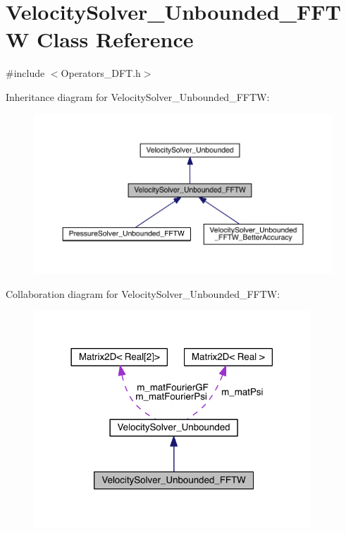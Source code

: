 \hypertarget{class_velocity_solver___unbounded___f_f_t_w}{}\section{Velocity\+Solver\+\_\+\+Unbounded\+\_\+\+F\+F\+T\+W Class Reference}
\label{class_velocity_solver___unbounded___f_f_t_w}


{\ttfamily \#include $<$Operators\+\_\+\+D\+F\+T.\+h$>$}



Inheritance diagram for Velocity\+Solver\+\_\+\+Unbounded\+\_\+\+F\+F\+T\+W\+:\nopagebreak
\begin{figure}[H]
\begin{center}
\leavevmode
\includegraphics[width=350pt]{dc/ddb/class_velocity_solver___unbounded___f_f_t_w__inherit__graph}
\end{center}
\end{figure}


Collaboration diagram for Velocity\+Solver\+\_\+\+Unbounded\+\_\+\+F\+F\+T\+W\+:\nopagebreak
\begin{figure}[H]
\begin{center}
\leavevmode
\includegraphics[width=294pt]{dc/d2d/class_velocity_solver___unbounded___f_f_t_w__coll__graph}
\end{center}
\end{figure}
